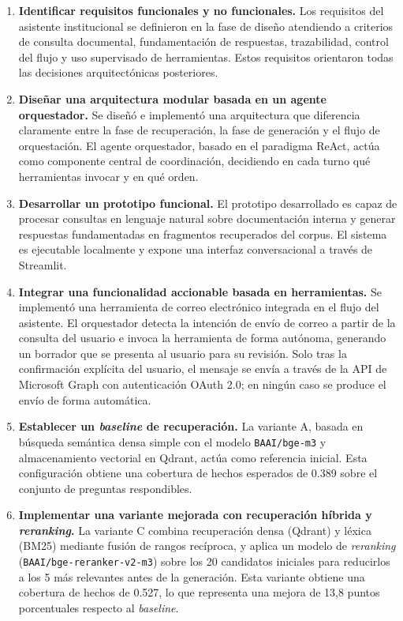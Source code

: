\begin{enumerate}
    \item \textbf{Identificar requisitos funcionales y no funcionales.} Los requisitos del asistente institucional se definieron en la fase de diseño atendiendo a criterios de consulta documental, fundamentación de respuestas, trazabilidad, control del flujo y uso supervisado de herramientas. 
    Estos requisitos orientaron todas las decisiones arquitectónicas posteriores. 

    \item \textbf{Diseñar una arquitectura modular basada en un agente orquestador.} Se diseñó e implementó una arquitectura que diferencia claramente entre la fase de recuperación, la fase de generación y el flujo de orquestación. 
    El agente orquestador, basado en el paradigma ReAct, actúa como componente central de coordinación, decidiendo en cada turno qué herramientas invocar y en qué orden.

    \item \textbf{Desarrollar un prototipo funcional.} El prototipo desarrollado es capaz de procesar consultas en lenguaje natural sobre documentación interna y generar respuestas fundamentadas en fragmentos recuperados del corpus. 
    El sistema es ejecutable localmente y expone una interfaz conversacional a través de Streamlit. 

    \item \textbf{Integrar una funcionalidad accionable basada en herramientas.} Se implementó una herramienta de correo electrónico integrada en el flujo del asistente.
    El orquestador detecta la intención de envío de correo a partir de la consulta del usuario e invoca la herramienta de forma autónoma, generando un borrador que se presenta al usuario para su revisión. Solo tras la confirmación explícita del usuario, el mensaje se envía a través de la API de Microsoft Graph con autenticación OAuth 2.0; en ningún caso se produce el envío de forma automática.

    \item \textbf{Establecer un \textit{baseline} de recuperación.} La variante A, basada en búsqueda semántica densa simple con el modelo \texttt{BAAI/bge-m3} y almacenamiento vectorial en Qdrant, actúa como referencia inicial. 
    Esta configuración obtiene una cobertura de hechos esperados de 0.389 sobre el conjunto de preguntas respondibles. 

    \item \textbf{Implementar una variante mejorada con recuperación híbrida y \textit{reranking}.} La variante C combina recuperación densa (Qdrant) y léxica (BM25) mediante fusión de rangos recíproca, y aplica un modelo de \textit{reranking} (\texttt{BAAI/bge-reranker-v2-m3}) sobre los 20 candidatos iniciales para reducirlos a los 5 más relevantes antes de la generación. 
    Esta variante obtiene una cobertura de hechos de 0.527, lo que representa una mejora de 13,8 puntos porcentuales respecto al \textit{baseline}. 


\end{enumerate}
